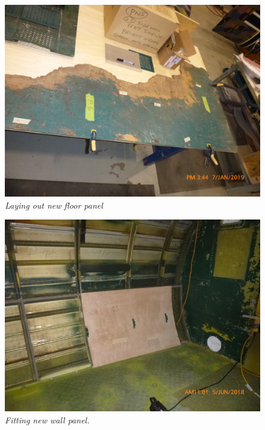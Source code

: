 \begin{figure}[httb]
   \vspace{2em}
   \centering
   \includegraphics[scale=0.5]{LayingOutNewFloorPanel-scaled.png}
   \caption*{\small \em Laying out new floor panel}
   \label{fig:wall-two}
\end{figure}

\begin{figure}[httb]
   \vspace{2em}
   \centering
   \includegraphics[scale=0.5]{NewWallPanelFitting-scaled.png}
   \caption*{\small \em Fitting new wall panel.}
   \label{fig:stab-one}
\end{figure}

